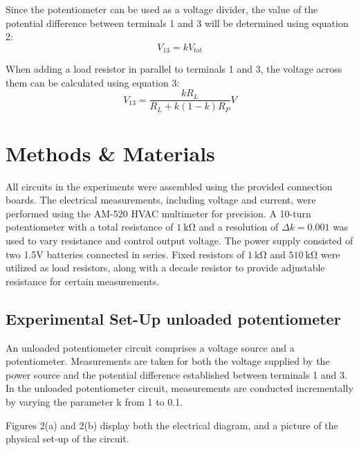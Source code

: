 \documentclass[a4paper]{article}
\newcommand{\unit}[1]{~\mathrm{#1}}
\begin{document}
Since the potentiometer can be used as a voltage divider, the value of the
potential difference between terminals 1 and 3 will be determined using equation
2\cite{report}:
\begin{equation}
    V_{13} = k V_{tot}
\end{equation} 

When adding a load resistor in parallel to terminals 1 and 3, the voltage across
them can be calculated using equation 3\cite{report}:
\begin{equation}
    V_{13} = \frac{kR_{L}}{R_{L}+k(1-k)R_P} V
\end{equation}
\section{Methods \& Materials}
All circuits in the experiments were assembled using the provided connection boards. 
The electrical measurements, including voltage and current, were performed using the AM-520 
HVAC multimeter for precision. 
A 10-turn potentiometer with a total resistance of $1 \unit{k\Omega}$ and a resolution of $\Delta k = 0.001$ 
was used to vary resistance and control output voltage. 
The power supply consisted of two 1.5V batteries connected in series. 
Fixed resistors of $1 \unit{k\Omega}$  and $510 \unit{k\Omega}$  were utilized as load resistors, 
along with a decade resistor to provide 
adjustable resistance for certain measurements.


\newpage
\subsection{Experimental Set-Up unloaded potentiometer}
An unloaded potentiometer circuit comprises a voltage source and a potentiometer.
Measurements are taken for both the voltage supplied by the power source
and the potential difference established between terminals 1 and 3. 
In the unloaded potentiometer circuit, measurements are conducted incrementally by varying the parameter 
k from 1 to 0.1. 

Figures 2(a) and 2(b) display both
the electrical diagram, and a picture of the physical set-up of the circuit.
\end{document}
